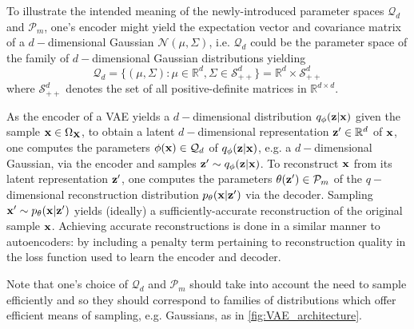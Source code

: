 \documentclass[11pt]{article}
\begin{document}
To illustrate the intended meaning of the newly-introduced parameter spaces $\mathcal{Q}_d$ and $\mathcal{P}_m$, one's encoder might yield the expectation vector and covariance matrix of a $d-$dimensional Gaussian $\mathcal{N}(\mu,\Sigma)$, i.e. $\mathcal{Q}_d$ could be the parameter space of the family of $d-$dimensional Gaussian distributions yielding
$$
\mathcal{Q}_d
=
\{
(\mu,\Sigma):\mu\in\mathbb{R}^d, \Sigma\in\mathcal{S}_{++}^d
\}
=
\mathbb{R}^d\times\mathcal{S}_{++}^d
$$
where $\mathcal{S}_{++}^d$ denotes the set of all positive-definite matrices in $\mathbb{R}^{d\times d}$.

As the encoder of a VAE yields a $d-$dimensional distribution $q_{\phi}(\mathbf{z}|\mathbf{x})$ given the sample $\mathbf{x}\in\Omega_{\mathbf{X}}$, to obtain a latent $d-$dimensional representation $\mathbf{z}'\in\mathbb{R}^d$ of $\mathbf{x}$, one computes the parameters $\phi(\mathbf{x})\in\mathcal{Q}_d$ of $q_{\phi}(\mathbf{z}|\mathbf{x})$, e.g. a $d-$dimensional Gaussian, via the encoder and samples $\mathbf{z}'\sim q_{\phi}(\mathbf{z}|\mathbf{x})$. To reconstruct $\mathbf{x}$ from its latent representation $\mathbf{z}'$, one computes the parameters $\theta(\mathbf{z}')\in\mathcal{P}_m$ of the $q-$dimensional reconstruction distribution $p_{\theta}(\mathbf{x}|\mathbf{z}')$ via the decoder. Sampling $\mathbf{x}'\sim p_{\theta}(\mathbf{x}|\mathbf{z}')$ yields (ideally) a sufficiently-accurate reconstruction of the original sample $\mathbf{x}$. Achieving accurate reconstructions is done in a similar manner to autoencoders: by including a penalty term pertaining to reconstruction quality in the loss function used to learn the encoder and decoder.

Note that one's choice of $\mathcal{Q}_d$ and $\mathcal{P}_m$ should take into account the need to sample efficiently and so they should correspond to families of distributions which offer efficient means of sampling, e.g. Gaussians, as in \autoref{fig:VAE_architecture}.
\end{document}
